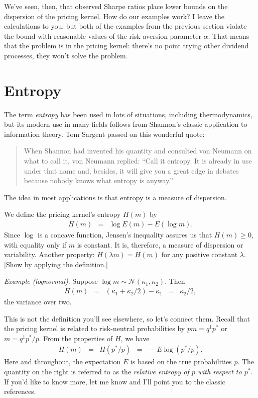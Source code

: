 \documentclass[11pt]{article}
\begin{document}
We've seen, then, that observed Sharpe ratios place lower bounds
on the dispersion of the pricing kernel.
How do our examples work?
I leave the calculations to you, but both of the examples from the previous
section violate the bound with reasonable values of the risk
aversion parameter $\alpha$.
That means that the problem is in the pricing kernel:
there's no point trying other dividend processes,
they won't solve the problem.


\section{Entropy}

The term {\it entropy\/} has been used in lots of situations, including thermodynamics,
but its modern use in many fields follows from Shannon's
classic application to information theory.
Tom Sargent passed on this wonderful quote:
%
\begin{quote}
When Shannon had invented his quantity and consulted
von Neumann on what to call it, von Neumann replied:
``Call it entropy. It is already in use under that name and,
besides, it will give you a great edge in debates because
nobody knows what entropy is anyway.''
\end{quote}
%
The idea in most applications is that entropy is a measure of dispersion.

We define the pricing kernel's entropy $H(m)$ by
\begin{eqnarray*}
    H(m) &=& \log E(m) - E (\log m) .
\end{eqnarray*}
Since $\log$ is a concave function,
Jensen's inequality assures us that $H(m) \geq 0$,
with equality only if $m$ is constant.
It is, therefore, a measure of dispersion or variability.
Another property:
$H(\lambda m) = H(m)$ for any positive constant $\lambda$.
[Show by applying the definition.]

{\it Example (lognormal)\/}.
Suppose $ \log m \sim \mathcal{N}(\kappa_1,\kappa_2)$.
Then
\begin{eqnarray*}
    H(m) &=& (\kappa_1 + \kappa_2/2) - \kappa_1
            \;\;=\;\; \kappa_2/2 ,
\end{eqnarray*}
the variance over two.

This is not the definition you'll see elsewhere, so let's connect them.
Recall that the pricing kernel is related to risk-neutral
probabilities by $ p m = q^1 p^* $ or $ m = q^1 p^*/p $.
From the properties of $H$, we have
\begin{eqnarray*}
        H(m) &=& H (p^*/p) \;\;=\;\; - E \log (p^*/p) .
\end{eqnarray*}
Here and throughout, the expectation $E$ is based on the true probabilities $p$.
The quantity on the right is referred to as the
{\it relative entropy of $p$ with respect to $p^*$\/}.
If you'd like to know more, let me know and I'll point you to the classic
references.
\end{document}
